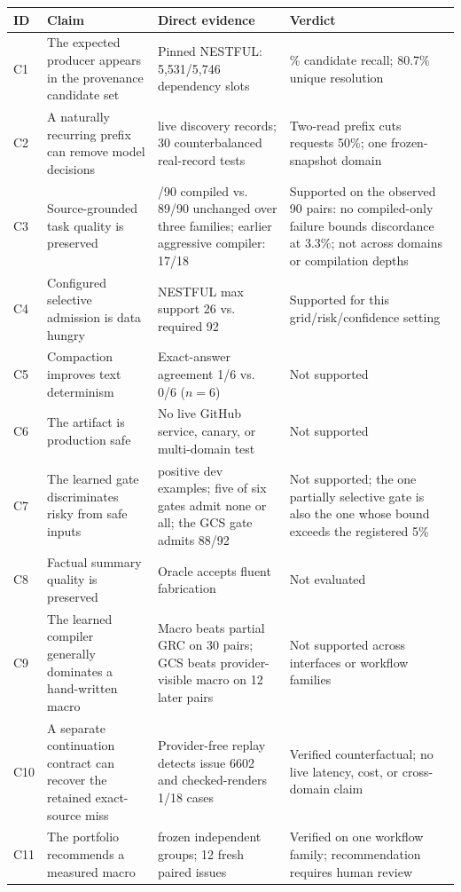 \begin{tabularx}{\linewidth}{@{}l >{\raggedright\arraybackslash}X >{\raggedright\arraybackslash}X >{\raggedright\arraybackslash}X@{}}
\toprule
ID & Claim & Direct evidence & Verdict \\
\midrule
C1 & The expected producer appears in the provenance candidate set & Pinned NESTFUL: 5,531/5,746 dependency slots & 96.3\% candidate recall; 80.7\% unique resolution \\
C2 & A naturally recurring prefix can remove model decisions & 132 live discovery records; 30 counterbalanced real-record tests & Two-read prefix cuts requests 50\%; one frozen-snapshot domain \\
C3 & Source-grounded task quality is preserved & 90/90 compiled vs. 89/90 unchanged over three families; earlier aggressive compiler: 17/18 & Supported on the observed 90 pairs: no compiled-only failure bounds discordance at 3.3\%; not across domains or compilation depths \\
C4 & Configured selective admission is data hungry & NESTFUL max support 26 vs. required 92 & Supported for this grid/risk/confidence setting \\
C5 & Compaction improves text determinism & Exact-answer agreement 1/6 vs. 0/6 ($n=6$) & Not supported \\
C6 & The artifact is production safe & No live GitHub service, canary, or multi-domain test & Not supported \\
C7 & The learned gate discriminates risky from safe inputs & 0 positive dev examples; five of six gates admit none or all; the GCS gate admits 88/92 & Not supported; the one partially selective gate is also the one whose bound exceeds the registered 5\% \\
C8 & Factual summary quality is preserved & Oracle accepts fluent fabrication & Not evaluated \\
C9 & The learned compiler generally dominates a hand-written macro & Macro beats partial GRC on 30 pairs; GCS beats provider-visible macro on 12 later pairs & Not supported across interfaces or workflow families \\
C10 & A separate continuation contract can recover the retained exact-source miss & Provider-free replay detects issue 6602 and checked-renders 1/18 cases & Verified counterfactual; no live latency, cost, or cross-domain claim \\
C11 & The portfolio recommends a measured macro & 30 frozen independent groups; 12 fresh paired issues & Verified on one workflow family; recommendation requires human review \\

\end{tabularx}
